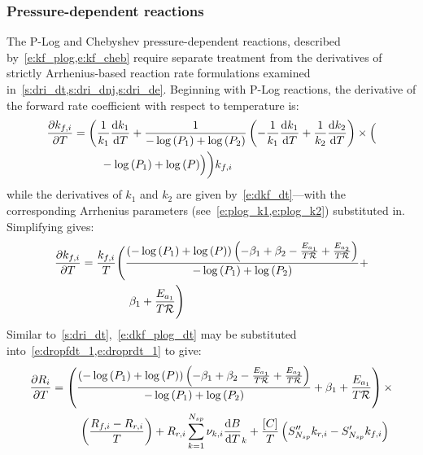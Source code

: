 \documentclass[12pt]{article}
\newcommand{\ns}{N_{sp}}
\newcommand{\Ru}{\mathcal{R}}
\begin{document}
\subsubsection{Pressure-dependent reactions}
\label{s:dri_pdep}
The P-Log and Chebyshev pressure-dependent reactions, described by~\cref{e:kf_plog,e:kf_cheb} require separate treatment from the derivatives of strictly Arrhenius-based reaction rate formulations examined in~\cref{s:dri_dt,s:dri_dnj,s:dri_de}.
Beginning with P-Log reactions, the derivative of the forward rate coefficient with respect to temperature is:
\begin{align}
 \frac{\partial {k_{f, i}} }{\partial T } &= \biggl( \frac{1}{k_{1}} \frac{\text{d} k_1 }{\text{d} T } + \frac{1}{- \log{\left (P_{1} \right )} + \log{\left (P_{2} \right )}} \left(- \frac{1}{k_{1}} \frac{\text{d} k_1 }{\text{d} T } + \frac{1}{k_{2}} \frac{\text{d} k_2 }{\text{d} T }\right) \times  \Bigl( \nonumber \\
					 & \mathindent - \log{\left (P_{1} \right )} + \log{\left (P \right )}\Bigr)\biggr) {k_{f, i}}
\end{align}
while the derivatives of $k_{1}$ and $k_{2}$ are given by~\cref{e:dkf_dt}---with the corresponding Arrhenius parameters (see~\cref{e:plog_k1,e:plog_k2}) substituted in.
Simplifying gives:
\begin{align}
 \label{e:dkf_plog_dt}
 \frac{\partial {k_{f, i}} }{\partial T } &= \frac{{k_{f, i}}}{T} \Biggl(\frac{\left(- \log{\left (P_{1} \right )} + \log{\left (P \right )}\right) \left(- \beta_1 + \beta_2 - \frac{E_{a_1}}{T \Ru} + \frac{E_{a_2}}{T \Ru}\right)}{- \log{\left (P_{1} \right )} + \log{\left (P_{2} \right )}} + \nonumber \\
					 & \mathindent[morespac] \beta_1 + \frac{E_{a_1}}{T \Ru}\Biggr)
\end{align}
Similar to~\cref{s:dri_dt},~\cref{e:dkf_plog_dt} may be substituted into~\cref{e:dropfdt_1,e:droprdt_1} to give:
\begin{align}
 \frac{\partial R_{i} }{\partial T } &= \left(\frac{\left(- \log{\left (P_{1} \right )} + \log{\left (P \right )}\right) \left(- \beta_1 + \beta_2 - \frac{E_{a_1}}{T \Ru} + \frac{E_{a_2}}{T \Ru}\right)}{- \log{\left (P_{1} \right )} + \log{\left (P_{2} \right )}} + \beta_1 + \frac{E_{a_1}}{T \Ru} \right) \times \nonumber \\
				     & \mathindent \left(\frac{{R_{f, i}} - {R_{r, i}}}{T}\right) + {R_{r, i}} \sum_{k=1}^{\ns} \nu_{k,i} \frac{\text{d} B }{\text{d} T }_{k} + \frac{[C]}{T} \left(S^{\prime\prime}_{\ns} {k_{r, i}} - S^{\prime}_{\ns} {k_{f, i}}\right)
\end{align}
\end{document}

